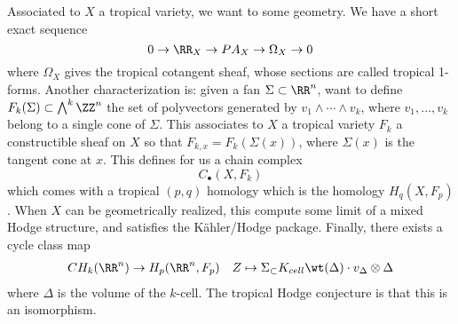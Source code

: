 


Associated to $X$ a tropical variety, we want to some geometry. We have a short exact sequence 
\[ 0 \to \RR_X\to PA_X\to \Omega_X\to 0\]
where $\Omega_X$ gives the tropical cotangent sheaf, whose sections are called tropical 1-forms. Another characterization is: given a fan $\Sigma\subset \RR^n$, want to define $F_k(\Sigma)\subset \bigwedge^k\ZZ^n$ the set of polyvectors generated by $v_1\wedge \cdots \wedge v_k$, where $v_1, \ldots, v_k$ belong to a single cone of $\Sigma$. This associates to $X$ a tropical variety $F_k$ a constructible sheaf on $X$ so that $F_{k, x}=F_k(\Sigma(x))$, where $\Sigma(x)$ is the tangent cone at $x$. This defines for us a chain complex 
\[C_\bullet(X, F_k)\]
which comes with a tropical $(p, q)$ homology which is the homology $H_q(X, F_p)$.  When $X$ can be geometrically realized, this compute some limit of a mixed Hodge structure, and satisfies the K\"ahler/Hodge package. Finally, there exists a cycle class map 
\begin{align*}
    CH_k(\RR^n)\to H_{p}(\RR^n, F_p)&&
    Z\mapsto \Sigma_\subset K_{cell} \wt(\Delta)\cdot v_\Delta \otimes \Delta
\end{align*}
where $\Delta$ is the volume of the $k$-cell. The tropical Hodge conjecture is that this is an isomorphism. 
